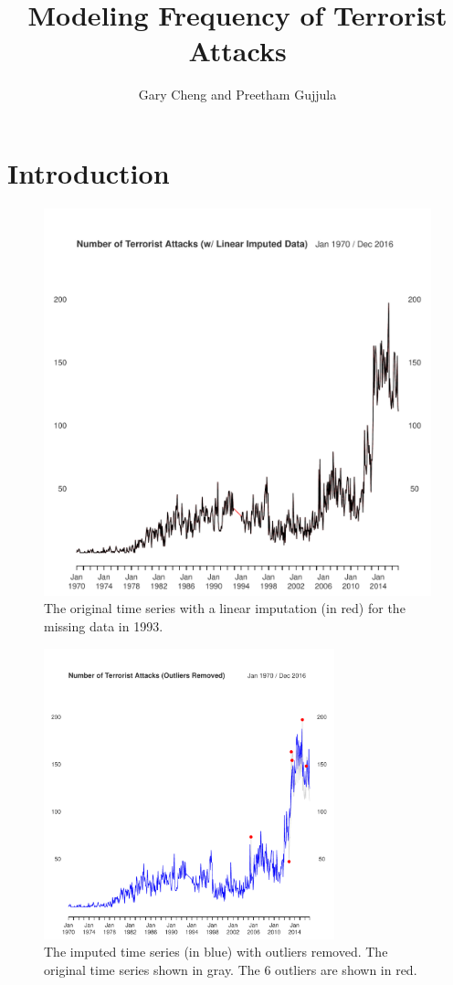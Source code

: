 \documentclass{paper}
\title{Modeling Frequency of Terrorist Attacks}
\author{Gary Cheng and Preetham Gujjula}
\begin{document}
\maketitle 

\section{Introduction}

\begin{figure}
\centering
\includegraphics[width=0.75\linewidth]{../image/og_ts.pdf}
\caption{The original time series with a linear imputation (in red) for the missing data in 1993.}
\label{og}
\end{figure}

\begin{figure}
\centering
    \includegraphics[width=0.75\textwidth]{../image/outlier_comparison.pdf}
\caption{The imputed time series (in blue) with outliers removed. The original time series shown in gray. The 6 outliers are shown in red. }
\label{outlier}
\end{figure}
\end{document}
